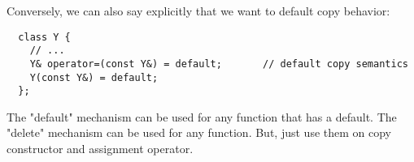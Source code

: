 Conversely, we can also say explicitly that we want to default copy behavior:
\begin{lstlisting}
  class Y {
    // ...
    Y& operator=(const Y&) = default;       // default copy semantics
    Y(const Y&) = default;
  };
\end{lstlisting}

The "default" mechanism can be used for any function that has a
default.  The "delete" mechanism can be used for any function.  But,
just use them on copy constructor and assignment operator.

